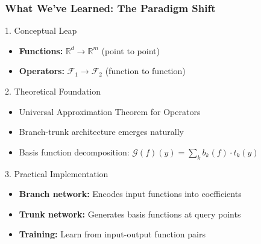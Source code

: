 \documentclass[notes]{beamer}
\begin{document}
\begin{frame}
\frametitle{What We've Learned: The Paradigm Shift}

\begin{block}{1. Conceptual Leap}
\begin{itemize}
    \item \textbf{Functions:} $\mathbb{R}^d \rightarrow \mathbb{R}^m$ (point to point)
    \item \textbf{Operators:} $\mathcal{F}_1 \rightarrow \mathcal{F}_2$ (function to function)
\end{itemize}
\end{block}

\begin{block}{2. Theoretical Foundation}
\begin{itemize}
    \item Universal Approximation Theorem for Operators
    \item Branch-trunk architecture emerges naturally
    \item Basis function decomposition: $\mathcal{G}(f)(y) = \sum_k b_k(f) \cdot t_k(y)$
\end{itemize}
\end{block}

\begin{block}{3. Practical Implementation}
\begin{itemize}
    \item \textbf{Branch network:} Encodes input functions into coefficients
    \item \textbf{Trunk network:} Generates basis functions at query points
    \item \textbf{Training:} Learn from input-output function pairs
\end{itemize}
\end{block}

\end{frame}
\end{document}
